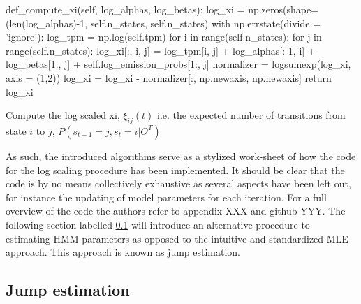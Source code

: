 \newpage
\begin{algorithm}[H]
def\_compute\_xi(self, log\_alphas, log\_betas): \;
\Indp 
log\_xi = np.zeros(shape=(len(log\_alphas)-1, self.n\_states, self.n\_states) \;
with np.errstate(divide = 'ignore'): \;
\Indp 
log\_tpm = np.log(self.tpm) \;
\BlankLine
\BlankLine
\Indm
for i in range(self.n\_states): \;
\Indp
for j in range(self.n\_states): \;
\Indp
log\_xi[:, i, j] = log\_tpm[i, j] + log\_alphas[:-1, i] + log\_betas[1:, j] + self.log\_emission\_probs[1:, j] \;
\Indm
\Indm
normalizer = logsumexp(log\_xi, axis = (1,2)) \;
\BlankLine
log\_xi = log\_xi - normalizer[:, np.newaxis, np.newaxis] \;
return log\_xi
\caption{Compute the log scaled xi, $\xi_{ij}(t)$ i.e. the expected number of transitions from state $i$ to $j$, $P(s_{t-1} = j, s_t = i |O^T)$}
\label{algo: log_scaled_xi}
\end{algorithm}

As such, the introduced algorithms serve as a stylized work-sheet of how the code for the log scaling procedure has been implemented. It should be clear that the code is by no means collectively exhaustive as several aspects have been left out, for instance the updating of model parameters for each iteration. For a full overview of the code the authors refer to appendix XXX and github YYY. The following section labelled \ref{subsection: Jump theory} will introduce an alternative procedure to estimating HMM parameters as opposed to the intuitive and standardized MLE approach. This approach is known as jump estimation.

\subsection{Jump estimation}
\label{subsection: Jump theory}

